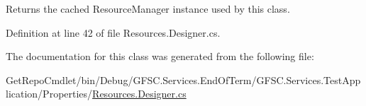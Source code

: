 Returns the cached Resource\+Manager instance used by this class. 



Definition at line 42 of file Resources.\+Designer.\+cs.



The documentation for this class was generated from the following file\+:\begin{DoxyCompactItemize}
\item 
Get\+Repo\+Cmdlet/bin/\+Debug/\+G\+F\+S\+C.\+Services.\+End\+Of\+Term/\+G\+F\+S\+C.\+Services.\+Test\+Application/\+Properties/\mbox{\hyperlink{_resources_8_designer_8cs}{Resources.\+Designer.\+cs}}\end{DoxyCompactItemize}
